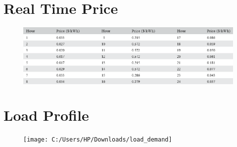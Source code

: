 	\section{Real Time Price}
	
		\begin{figure}[!h]
			\centering
			\includegraphics[width=0.7\linewidth]{Figures/rtp}
			\caption{}
			\label{fig:rtp}
		\end{figure}
	\section{Load Profile}
		\begin{figure}
			\centering
			\texttt{[image: C:/Users/HP/Downloads/load\_demand]}
			\caption{}
			\label{fig:loaddemand}
		\end{figure}
		
	
		
	
	